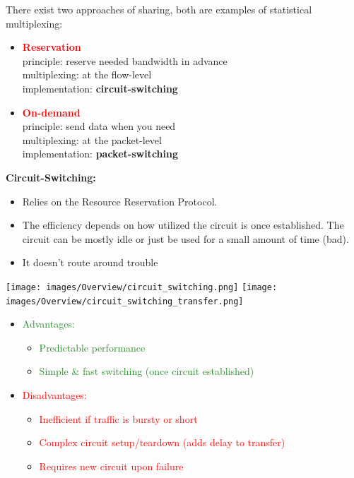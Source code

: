 \documentclass[a4paper, fontsize=8pt, landscape, DIV=1]{scrartcl}
\begin{document}
\begin{multicols*}{4}
				There exist two approaches of sharing, both are examples of statistical multiplexing: 
				\begin{itemize}
					\item \textcolor{red}{\textbf{Reservation}}\\
						  principle: reserve needed bandwidth in advance\\
						  multiplexing: at the flow-level\\
						  implementation: \textbf{circuit-switching}  
					\item \textcolor{red}{\textbf{On-demand}}\\
						  principle: send data when you need\\
						  multiplexing: at the packet-level\\
						  implementation: \textbf{packet-switching}
				\end{itemize}
				\textbf{Circuit-Switching:}
				\vspace{-0.5cm}
				\begin{itemize}[noitemsep]
					\item Relies on the Resource Reservation Protocol.
					\item The efficiency depends on how utilized the circuit is once established. The circuit can be mostly idle or just be used for a small amount of time (bad).
					\item It doesn't route around trouble 
				\end{itemize}
				\texttt{[image: images/Overview/circuit\_switching.png]}
				\texttt{[image: images/Overview/circuit\_switching\_transfer.png]}
				\begin{itemize}[noitemsep]
					\item \textcolor{ForestGreen}{Advantages:}
					\begin{itemize}
						\item \textcolor{ForestGreen}{Predictable performance} 
						\item \textcolor{ForestGreen}{Simple \& fast switching (once circuit established)}
					\end{itemize}
					\item \textcolor{red}{Disadvantages:}
					\begin{itemize}
						\item \textcolor{red}{Inefficient if traffic is bursty or short}
						\item \textcolor{red}{Complex circuit setup/teardown (adds delay to transfer)}
						\item \textcolor{red}{Requires new circuit upon failure}
					\end{itemize} 
				\end{itemize}
				\columnbreak
				

\end{multicols*}
\end{document}
